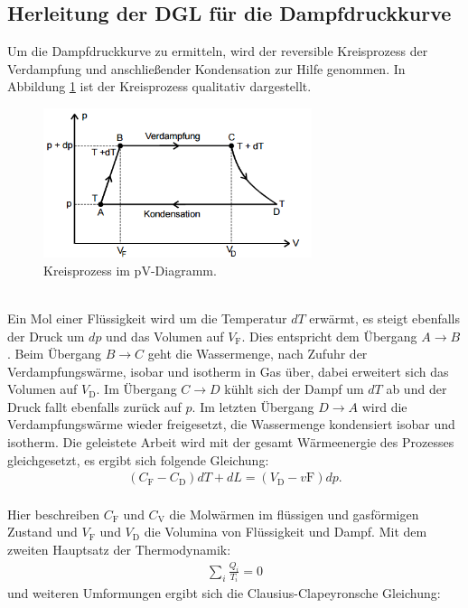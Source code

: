  \subsection{Herleitung der DGL für die Dampfdruckkurve}
Um die Dampfdruckkurve zu ermitteln, wird der reversible Kreisprozess der
Verdampfung und anschließender Kondensation zur Hilfe genommen.
In Abbildung \ref{fig:kreisprozess} ist der Kreisprozess qualitativ dargestellt.
\begin{figure}
 \centering
 \includegraphics[width=0.7\textwidth]{kreisprozess.png}
 \caption{Kreisprozess im pV-Diagramm. }
 \label{fig:kreisprozess}
 \end{figure}\\
Ein Mol einer Flüssigkeit wird um die Temperatur $dT$ erwärmt, es steigt ebenfalls
der Druck um $dp$ und das Volumen auf $V_\mathrm{F}$. Dies entspricht dem Übergang $A\longrightarrow B$.
Beim Übergang $B\longrightarrow C$ geht die Wassermenge, nach Zufuhr der Verdampfungswärme, isobar
und isotherm in Gas über, dabei erweitert sich das Volumen auf $V_\mathrm{D}$.
Im Übergang $C \longrightarrow D$ kühlt sich der Dampf um $dT$ ab und der Druck
fallt ebenfalls zurück auf $p$. Im letzten Übergang $D\longrightarrow A$ wird die
Verdampfungswärme wieder freigesetzt, die Wassermenge kondensiert isobar und isotherm.
Die geleistete Arbeit wird mit der gesamt Wärmeenergie des Prozesses gleichgesetzt,
es ergibt sich folgende Gleichung:
\begin{align}
(C_\mathrm{F}-C_\mathrm{D})dT+dL=(V_\mathrm{D}-v\mathrm{F})dp.
\end{align}\\
Hier beschreiben $C_\mathrm{F}$ und $C_\mathrm{V}$ die Molwärmen im flüssigen und
gasförmigen Zustand und $V_\mathrm{F}$ und $V_\mathrm{D}$ die Volumina von Flüssigkeit und Dampf.
Mit dem zweiten Hauptsatz der Thermodynamik:
\begin{align}
\sum_{i}\frac{Q_i}{T_i}=0
\end{align}
und weiteren Umformungen ergibt sich die Clausius-Clapeyronsche Gleichung:

